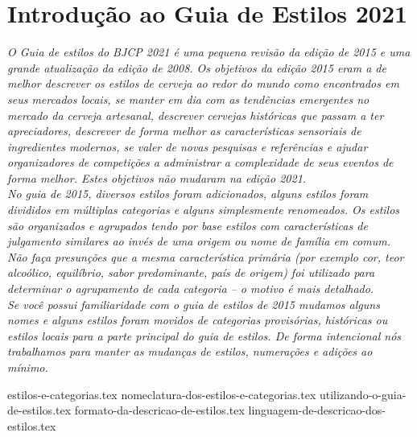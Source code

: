 \clearpage
{}
\divisorLine
\section*{Introdução ao Guia de Estilos 2021}
\textit{O Guia de estilos do BJCP 2021 é uma pequena revisão da edição de 2015 e uma grande atualização da edição de 2008. Os objetivos da edição 2015 eram a de melhor descrever os estilos de cerveja ao redor do mundo como encontrados em seus mercados locais, se manter em dia com as tendências emergentes no mercado da cerveja artesanal, descrever cervejas históricas que passam a ter apreciadores, descrever de forma melhor as características sensoriais de ingredientes modernos, se valer de novas pesquisas e referências e ajudar organizadores de competições a administrar a complexidade de seus eventos de forma melhor. Estes objetivos não mudaram na edição 2021.}\\
\textit{No guia de 2015, diversos estilos foram adicionados, alguns estilos foram divididos em múltiplas categorias e alguns simplesmente renomeados. Os estilos são organizados e agrupados tendo por base estilos com características de julgamento similares ao invés de uma origem ou nome de família em comum. Não faça presunções que a mesma característica primária (por exemplo cor, teor alcoólico, equilíbrio, sabor predominante, país de origem) foi utilizado para determinar o agrupamento de cada categoria – o motivo é mais detalhado.}\\
\textit{Se você possui familiaridade com o guia de estilos de 2015 mudamos alguns nomes e alguns estilos foram movidos de categorias provisórias, históricas ou estilos locais para a parte principal do guia de estilos. De forma intencional nós trabalhamos para manter as mudanças de estilos, numerações e adições ao mínimo.}\\
\begin{multicols*}{2}
{estilos-e-categorias.tex}
{nomeclatura-dos-estilos-e-categorias.tex}
{utilizando-o-guia-de-estilos.tex}
{formato-da-descricao-de-estilos.tex}
{linguagem-de-descricao-dos-estilos.tex}
\end{multicols*}